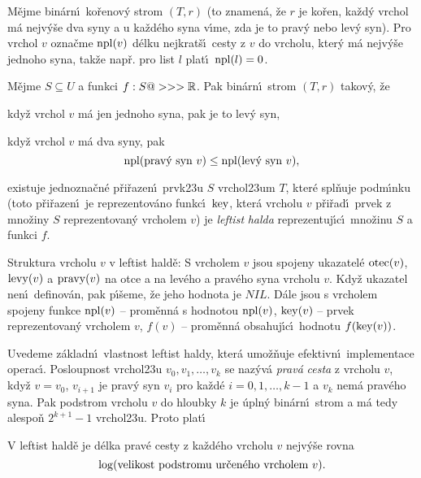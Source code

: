 \flushpar M\v ejme bin\'arn\'\i\ ko\v renov\'y strom $(T,r)$ (to znamen\'a, \v ze $
r$ je ko\v ren, 
ka\v zd\'y vrchol m\'a nejv\'y\v se dva syny a u ka\v zd\'eho syna 
v\'\i me, zda je to prav\'y nebo lev\'y syn). Pro vrchol $v$ 
ozna\v cme $\operatorname{npl}(v)$ d\'elku nejkrat\v s\'\i\ cesty z $v$ do vrcholu, kter\'y m\'a 
nejv\'y\v se jednoho syna, tak\v ze nap\v r. pro list $l$ plat\'\i\ $\operatorname{npl}
(l)=0$. 
\medskip

\flushpar M\v ejme $S\subseteq U$ a funkci $f:S@>>>\Bbb R$. Pak bin\'arn\'\i\ strom 
$(T,r)$ takov\'y, \v ze
\roster
\item
kdy\v z vrchol $v$ m\'a jen jednoho syna, pak je to lev\'y syn,
\item
kdy\v z vrchol $v$ m\'a dva syny, pak 
$$\operatorname{npl}(\text{\rm prav\'y syn }v)\le\operatorname{npl}(\text{\rm lev\'y syn }v),$$
\item
existuje jednozna\v cn\'e p\v ri\v razen\'\i\ prvk\accent23u $S$  
vrchol\accent23um $T$, kter\'e spl\v nuje podm\'\i nku  
(toto p\v ri\v razen\'\i\ 
je reprezentov\'ano funkc\'\i\ $\operatorname{key}$, kter\'a vrcholu $v$ p\v ri\v rad\'\i\ prvek 
z mno\v zi\-ny $S$ reprezentovan\'y vrcholem $v$)
\endroster
je \emph{leftist} \emph{halda} 
reprezentuj\'\i c\'\i\ mno\v zinu $S$ a funkci $f$. 
\medskip

\flushpar Struktura vrcholu $v$ v leftist hald\v e:\newline 
S vrcholem $v$ jsou 
spojeny ukazatel\'e $\operatorname{otec}(v)$, $\operatorname{levy}(v)$ a $\operatorname{pravy}(v)$ na otce a 
na lev\'eho a prav\'eho syna vrcholu $v$.  
Kdy\v z ukazatel nen\'\i\ definov\'an, pak p\'\i\v seme, \v ze jeho hodnota je 
$NIL$.  D\'ale jsou s vrcholem spojeny funkce\newline 
$\operatorname{npl}(v)$ -- prom\v enn\'a s hodnotou $\operatorname{npl}(v)$,\newline 
$\operatorname{key}(v)$ -- prvek reprezentovan\'y vrcholem $v$,\newline 
$f(v)$ -- prom\v enn\'a obsahuj\'\i c\'\i\ hodnotu $f(\operatorname{key}(v))$.
\medskip

\flushpar Uvedeme z\'akladn\'\i\ vlastnost leftist haldy, kter\'a 
umo\v z\v nuje efektivn\'\i\ implementace operac\'\i . 
Posloupnost vrchol\accent23u $v_0,v_1,\dots,v_k$ se naz\'yv\'a 
\emph{prav\'a} \emph{cesta} z vrcholu $v$, kdy\v z $v=v_0$, $v_{i
+1}$ 
je prav\'y syn $v_i$ pro ka\v zd\'e $i=0,1,\dots,k-1$ a $v_k$ nem\'a 
prav\'eho syna. Pak podstrom vrcholu $v$ do hloubky $k$ je 
\'upln\'y bin\'arn\'\i\ strom a m\'a tedy  
alespo\v n $2^{k+1}-1$ vrchol\accent23u. Proto plat\'\i\ 

V leftist hald\v e je 
d\'elka prav\'e cesty z ka\v zd\'eho vrcholu $v$ nejv\'y\v se rovna 
$$\log(\text{\rm velikost podstromu ur\v cen\'eho vrcholem }v).$$
\endproclaim
\bigskip

